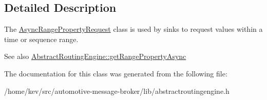 \subsection{Detailed Description}
The \hyperlink{classAsyncRangePropertyRequest}{Async\+Range\+Property\+Request} class is used by sinks to request values within a time or sequence range. 

\begin{DoxySeeAlso}{See also}
\hyperlink{classAbstractRoutingEngine_a9befec62882b5cbf956b75dc99eedf21}{Abstract\+Routing\+Engine\+::get\+Range\+Property\+Async} 
\end{DoxySeeAlso}


The documentation for this class was generated from the following file\+:\begin{DoxyCompactItemize}
\item 
/home/kev/src/automotive-\/message-\/broker/lib/abstractroutingengine.\+h\end{DoxyCompactItemize}

